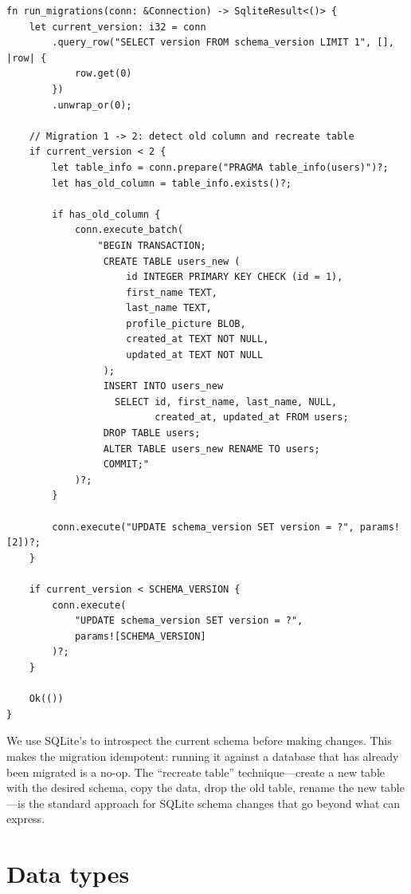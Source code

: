 \begin{listing}[H]
\caption{Migration from schema v1 to v2}
\label{lst:ch20-migrations}
\begin{verbatim}
fn run_migrations(conn: &Connection) -> SqliteResult<()> {
    let current_version: i32 = conn
        .query_row("SELECT version FROM schema_version LIMIT 1", [], |row| {
            row.get(0)
        })
        .unwrap_or(0);

    // Migration 1 -> 2: detect old column and recreate table
    if current_version < 2 {
        let table_info = conn.prepare("PRAGMA table_info(users)")?;
        let has_old_column = table_info.exists()?;

        if has_old_column {
            conn.execute_batch(
                "BEGIN TRANSACTION;
                 CREATE TABLE users_new (
                     id INTEGER PRIMARY KEY CHECK (id = 1),
                     first_name TEXT,
                     last_name TEXT,
                     profile_picture BLOB,
                     created_at TEXT NOT NULL,
                     updated_at TEXT NOT NULL
                 );
                 INSERT INTO users_new
                   SELECT id, first_name, last_name, NULL,
                          created_at, updated_at FROM users;
                 DROP TABLE users;
                 ALTER TABLE users_new RENAME TO users;
                 COMMIT;"
            )?;
        }

        conn.execute("UPDATE schema_version SET version = ?", params![2])?;
    }

    if current_version < SCHEMA_VERSION {
        conn.execute(
            "UPDATE schema_version SET version = ?",
            params![SCHEMA_VERSION]
        )?;
    }

    Ok(())
}
\end{verbatim}
\end{listing}

We use SQLite's  to introspect the current schema before making changes. This makes the migration idempotent: running it against a database that has already been migrated is a no-op. The ``recreate table'' technique---create a new table with the desired schema, copy the data, drop the old table, rename the new table---is the standard approach for SQLite schema changes that go beyond what  can express.

\section{Data types}
\label{sec:db-types}


